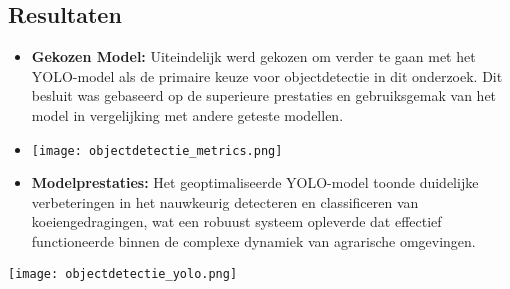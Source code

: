 \subsection{Resultaten}
\begin{itemize}
  \item \textbf{Gekozen Model:}   Uiteindelijk werd gekozen om verder te gaan met het YOLO-model als de primaire keuze voor objectdetectie in dit onderzoek. Dit besluit was gebaseerd op de superieure prestaties en gebruiksgemak van het model in vergelijking met andere geteste modellen.
  \item \texttt{[image: objectdetectie\_metrics.png]}
  \item \textbf{Modelprestaties:} Het geoptimaliseerde YOLO-model toonde duidelijke verbeteringen in het nauwkeurig detecteren en classificeren van koeiengedragingen, wat een robuust systeem opleverde dat effectief functioneerde binnen de complexe dynamiek van agrarische omgevingen.
\end{itemize}
\newline
\texttt{[image: objectdetectie\_yolo.png]}
\newline